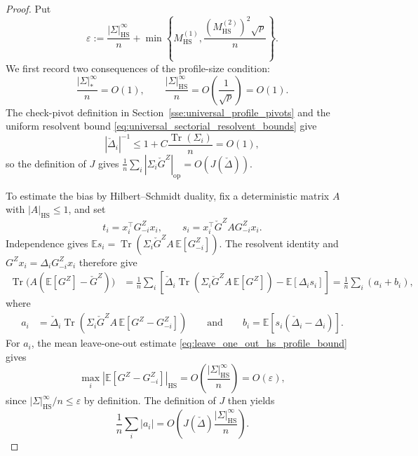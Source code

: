 \documentclass[EJP, preprint, NODS, nobera, nofontexpansion]{ejpecp}
\DeclareMathOperator{\op}{op}
\DeclareMathOperator{\tr}{Tr}
\DeclareMathOperator{\hs}{HS}
\begin{document}
\begin{proof}
Put
\[
 \varepsilon:=\frac{|\Sigma|_{\hs}^\infty}n
 +\min\left\{
  M_{\hs}^{(1)},
  \frac{(M_{\hs}^{(2)})^2\sqrt p}{n}
 \right\}.
\]
We first record two consequences of the profile-size condition:
\[
 \frac{|\Sigma|_*^\infty}n=O(1),
 \qquad \frac{|\Sigma|_{\hs}^\infty}n=O\!\left(\frac1{\sqrt p}\right)=O(1).
\]
The check-pivot definition in Section~\ref{sse:universal_profile_pivots}
and the uniform resolvent bound
\eqref{eq:universal_sectorial_resolvent_bounds} give
\[
 |\check\Delta_i|^{-1}
 \leq 1+C\frac{\tr(\Sigma_i)}n=O(1),
\]
so the definition of \(J\) gives $\frac1n\sum_i|\Sigma_i\check G^Z|_{\op}=O\left(J(\check\Delta)\right)$.


To estimate the bias by Hilbert--Schmidt duality, fix a deterministic
matrix $A$ with $|A|_{\hs}\leq1$, and set
\[
 t_i=x_i^\top G_{-i}^Z x_i,
 \qquad s_i=x_i^\top\check G^Z A G_{-i}^Z x_i.
\]
Independence gives
$\mathbb Es_i=\tr(\Sigma_i\check G^Z A\,\mathbb E[G_{-i}^Z])$.
The resolvent identity and $G^Zx_i=\Delta_iG_{-i}^Zx_i$ therefore give
\begin{align*}
 \tr\bigl(A(\mathbb E[G^Z]-\check G^Z)\bigr)
 &=\frac1n\sum_i\left[
     \check\Delta_i\tr\!\left(\Sigma_i\check G^Z A\,\mathbb E[G^Z]\right)
     -\mathbb E[\Delta_i s_i]
   \right]
   =\frac1n\sum_i(a_i+b_i),
\end{align*}
where
\begin{align*}
 a_i&=\check\Delta_i\tr\left(
       \Sigma_i\check G^Z A\,\mathbb E[G^Z-G_{-i}^Z]\right)
       \qquad \text{and}\qquad
       b_i=\mathbb E\left[s_i(\check\Delta_i-\Delta_i)\right].
\end{align*}
For \(a_i\), the mean leave-one-out estimate
\eqref{eq:leave_one_out_hs_profile_bound} gives
\[
 \max_i|\mathbb E[G^Z-G_{-i}^Z]|_{\hs}
 =O\left(\frac{|\Sigma|_{\hs}^\infty}n\right)=O(\varepsilon),
\]
since $|\Sigma|_{\hs}^\infty/n\leq\varepsilon$ by definition.
The definition of $J$ then yields
\[
 \frac1n\sum_i|a_i|
 =O\left(J(\check\Delta)\frac{|\Sigma|_{\hs}^\infty}n\right).
\]


\end{proof}
\end{document}
